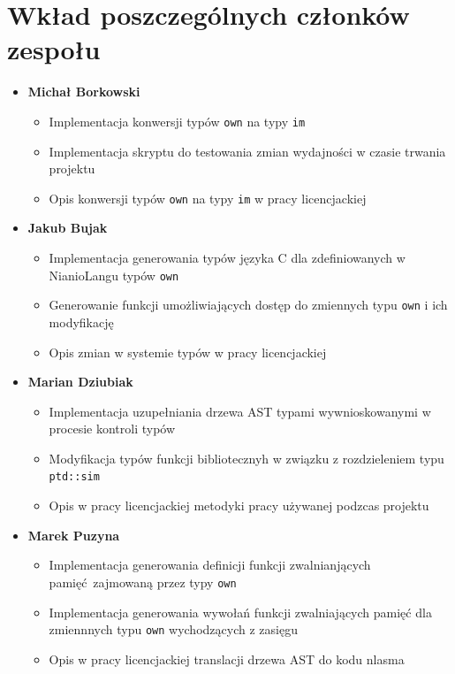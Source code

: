\documentclass[licencjacka]{pracamgr}
\begin{document}
\chapter{Wkład poszczególnych członków zespołu}
\begin{itemize}
  \item[] \textbf{Michał Borkowski}
  \begin{itemize}
   \item Implementacja konwersji typów \texttt{own} na typy \texttt{im}
   \item Implementacja skryptu do testowania zmian wydajności w czasie trwania projektu
   \item Opis konwersji typów \texttt{own} na typy \texttt{im} w pracy licencjackiej
  \end{itemize}

  \item[] \textbf{Jakub Bujak}
  \begin{itemize}
   \item Implementacja generowania typów języka C dla zdefiniowanych w NianioLangu typów \texttt{own}
   \item Generowanie funkcji umożliwiających dostęp do zmiennych typu \texttt{own} i ich modyfikację
   \item Opis zmian w systemie typów w pracy licencjackiej
  \end{itemize}

  \item[] \textbf{Marian Dziubiak}
  \begin{itemize}
   \item Implementacja uzupełniania drzewa AST typami wywnioskowanymi w procesie kontroli typów
   \item Modyfikacja typów funkcji bibliotecznyh w związku z rozdzieleniem typu \texttt{ptd::sim}
   \item Opis w pracy licencjackiej metodyki pracy używanej podzcas projektu
  \end{itemize}

  \item[] \textbf{Marek Puzyna}
  \begin{itemize}
   \item Implementacja generowania definicji funkcji zwalnianjących pamięć zajmowaną przez typy \texttt{own}
   \item Implementacja generowania wywołań funkcji zwalniających pamięć dla zmiennnych typu \texttt{own} wychodzących
     z zasięgu
   \item Opis w pracy licencjackiej translacji drzewa AST do kodu nlasma
  \end{itemize}
\end{itemize}
\end{document}
